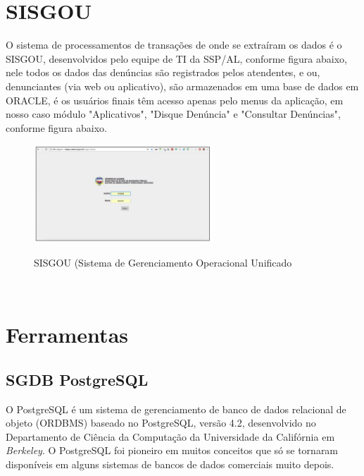 \section{SISGOU}

O sistema de processamentos de transa\c{c}\~{o}es de onde se extraíram os dados \'{e} o SISGOU, desenvolvidos pelo equipe de TI da SSP/AL, conforme figura abaixo, nele todos os dados das denúncias s\~{a}o registrados pelos atendentes, e ou, denunciantes (via web ou aplicativo), s\~{a}o armazenados em uma base de dados em ORACLE, \'{e} os usu\'{a}rios finais têm acesso apenas pelo menus da aplica\c{c}\~{a}o, em nosso caso m\'odulo "Aplicativos", "Disque Denúncia" e "Consultar Denúncias", conforme figura abaixo.

\begin{figure}[H]
	\vspace*{0,2cm}
    \centering
    \caption{SISGOU (Sistema de Gerenciamento Operacional Unificado}
    \includegraphics[width=0.6\textwidth]{./04-figuras/figura-13}
    \label{fig:ilustfig13}
\end{figure}
\vspace*{-0,9cm}
{\raggedright {}}\\


\section{Ferramentas}


\subsection{SGDB PostgreSQL}

O PostgreSQL \'{e} um sistema de gerenciamento de banco de dados relacional de objeto (ORDBMS) baseado no PostgreSQL, vers\~{a}o 4.2, desenvolvido no Departamento de Ciência da Computa\c{c}\~{a}o da Universidade da Calif\'ornia em \textit{Berkeley}. O PostgreSQL foi pioneiro em muitos conceitos que s\'o se tornaram disponíveis em alguns sistemas de bancos de dados comerciais muito depois.

